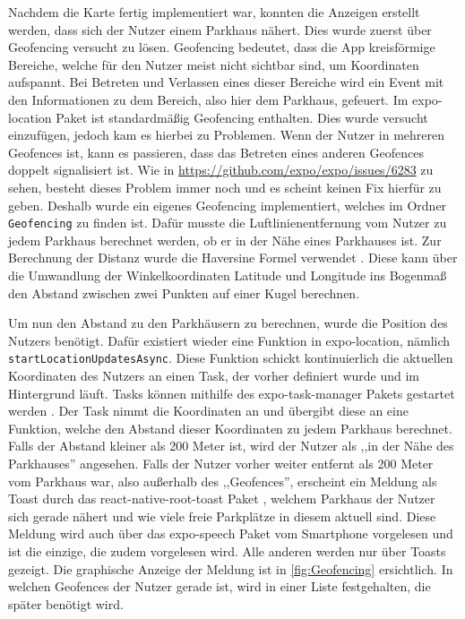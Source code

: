 Nachdem die Karte fertig implementiert war, konnten die Anzeigen erstellt werden, dass sich der Nutzer einem Parkhaus nähert. Dies wurde zuerst über Geofencing versucht zu lösen. Geofencing bedeutet, dass die App kreisförmige Bereiche, welche für den Nutzer meist nicht sichtbar sind, um Koordinaten aufspannt. Bei Betreten und Verlassen eines dieser Bereiche wird ein Event mit den Informationen zu dem Bereich, also hier dem Parkhaus, gefeuert. Im expo-location Paket ist standardmäßig Geofencing enthalten. Dies wurde versucht einzufügen, jedoch kam es hierbei zu Problemen. Wenn der Nutzer in mehreren Geofences ist, kann es passieren, dass das Betreten eines anderen Geofences doppelt signalisiert ist. Wie in \url{https://github.com/expo/expo/issues/6283} zu sehen, besteht dieses Problem immer noch und es scheint keinen Fix hierfür zu geben. Deshalb wurde ein eigenes Geofencing implementiert, welches im Ordner \verb|Geofencing| zu finden ist. Dafür musste die Luftlinienentfernung vom Nutzer zu jedem Parkhaus berechnet werden, ob er in der Nähe eines Parkhauses ist. Zur Berechnung der Distanz wurde die Haversine Formel verwendet \cite{haversine}. Diese kann über die Umwandlung der Winkelkoordinaten Latitude und Longitude ins Bogenmaß den Abstand zwischen zwei Punkten auf einer Kugel berechnen.

Um nun den Abstand zu den Parkhäusern zu berechnen, wurde die Position des Nutzers benötigt. Dafür existiert wieder eine Funktion in expo-location, nämlich \verb|startLocationUpdatesAsync|. Diese Funktion schickt kontinuierlich die aktuellen Koordinaten des Nutzers an einen Task, der vorher definiert wurde und im Hintergrund läuft. Tasks können mithilfe des expo-task-manager Pakets gestartet werden \cite{task}. Der Task nimmt die Koordinaten an und übergibt diese an eine Funktion, welche den Abstand dieser Koordinaten zu jedem Parkhaus berechnet. Falls der Abstand kleiner als 200 Meter ist, wird der Nutzer als ,,in der Nähe des Parkhauses'' angesehen. Falls der Nutzer vorher weiter entfernt als 200 Meter vom Parkhaus war, also außerhalb des ,,Geofences'', erscheint ein Meldung als Toast durch das react-native-root-toast Paket \cite{toast}, welchem Parkhaus der Nutzer sich gerade nähert und wie viele freie Parkplätze in diesem aktuell sind. Diese Meldung wird auch über das expo-speech Paket vom Smartphone vorgelesen \cite{tts} und ist die einzige, die zudem vorgelesen wird. Alle anderen werden nur über Toasts gezeigt. Die graphische Anzeige der Meldung ist in \autoref{fig:Geofencing} ersichtlich. In welchen Geofences der Nutzer gerade ist, wird in einer Liste festgehalten, die später benötigt wird.

